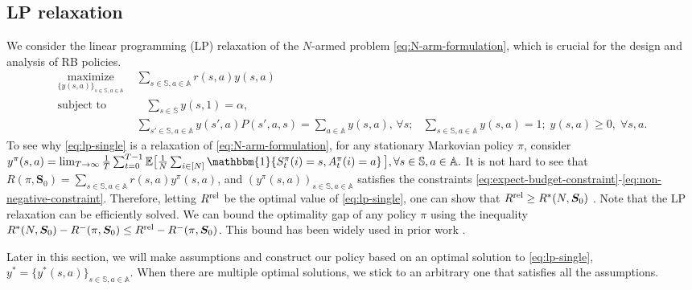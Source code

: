 \documentclass[11pt,letterpaper]{article}
\theoremstyle{plain}
\theoremstyle{definition}
\theoremstyle{remark}
\newcommand{\Ebig}[1]{\mathbb{E}\big[#1\big]}
\newcommand{\indibrac}[1]{\mathbbm{1}\!\left\{#1\right\}}
\newcommand{\ve}[1]{\bm{#1}}
\newcommand{\veS}{\ve{S}}
\newcommand{\sspa}{\mathbb{S}}
\newcommand{\aspa}{\mathbb{A}}
\newcommand{\sumN}{\sum_{i\in[N]}}
\newcommand{\sumsa}{\sum_{s\in\sspa, a\in\aspa}}
\newcommand{\rel}{\textup{rel}} %
\newcommand{\ravg}{R}
\newcommand{\rsysn}{\ravg(\pi, \veS_0)}
\newcommand{\rliminf}{\ravg^{-}(\pi, \veS_0)}
\newcommand{\ropt}{\ravg^*(N, \veS_0)}
\newcommand{\rrel}{\ravg^\rel}
\begin{document}
\subsection{LP relaxation}\label{sec:lp-relaxation}




We consider the linear programming (LP) relaxation of the $N$-armed problem \eqref{eq:N-arm-formulation}, which is crucial for the design and analysis of RB policies. 
\begin{align}
    \label{eq:lp-single} \tag{LP} \underset{\{y(s, a)\}_{s\in\sspa,a\in\aspa}}{\text{maximize}} \mspace{6mu}&\sum_{s\in\sspa,a\in\aspa} r(s, a) y(s, a) \\
    \text{subject to}\mspace{6mu}
    &\mspace{15mu}\sum_{s\in\sspa} y(s, 1) = \alpha, \label{eq:expect-budget-constraint}\\
    & \sum_{s'\in\sspa, a\in\aspa} \!\!\! y(s', a) P(s', a, s) = \sum_{a\in\aspa} y(s,a),\, \forall s; 
    &\sum_{s\in\sspa, a\in\aspa} \!\!\! y(s,a) = 1;  
    \;
     y(s,a) \geq 0, \; \forall s,a. \label{eq:non-negative-constraint}
\end{align} 
To see why \eqref{eq:lp-single} is a relaxation of \eqref{eq:N-arm-formulation}, for any stationary Markovian policy $\pi$, consider 
$
    y^\pi(s,a) = \lim_{T\to\infty} \frac{1}{T} \sum_{t=0}^{T-1} \Ebig{\frac{1}{N} \sumN \indibrac{S_t^\pi(i) = s, A_t^\pi(i) = a}}, \forall s\in\sspa, a\in\aspa.
$
It is not hard to see that $\rsysn = \sumsa r(s,a)y^\pi(s,a)$, and $(y^\pi(s,a))_{s\in\sspa, a\in\aspa}$ satisfies the constraints \eqref{eq:expect-budget-constraint}-\eqref{eq:non-negative-constraint}. 
Therefore, letting $\rrel$ be the optimal value of \eqref{eq:lp-single}, one can show that $\rrel \geq \ropt$ \citep[][]{HonXieCheWan_24}. 
Note that the LP relaxation can be efficiently solved. We can bound the optimality gap of any policy $\pi$ using the inequality $\ropt - \rliminf \leq \rrel - \rliminf$. 
This bound has been widely used in prior work \citep{WebWei_90,Ver_16_verloop,GasGauYan_23_exponential,GasGauYan_23_whittles,HonXieCheWan_23}.

Later in this section, we will make assumptions and construct our policy based on an optimal solution to \eqref{eq:lp-single}, $y^* = \{y^*(s, a)\}_{s\in\sspa,a\in\aspa}$. When there are multiple optimal solutions, we stick to an arbitrary one that satisfies all the assumptions. 
\end{document}
